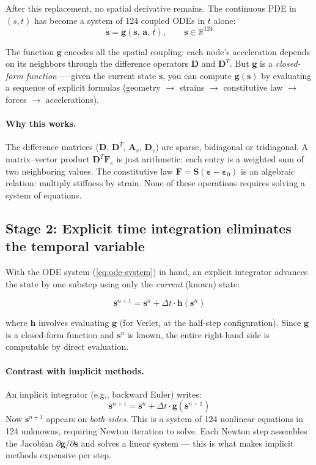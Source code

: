 \documentclass[11pt]{article}
\newcommand{\vect}[1]{\mathbf{#1}}
\newcommand{\mat}[1]{\mathbf{#1}}
\newcommand{\Real}{\mathbb{R}}
\begin{document}
\noindent
After this replacement, no spatial derivative remains.
The continuous PDE in $(s, t)$ has become a system of 124 coupled ODEs in $t$ alone:
\begin{equation}
  \dot{\vect{s}} = \vect{g}(\vect{s},\, \vect{a},\, t),
  \qquad \vect{s} \in \Real^{124}
  \label{eq:ode-system}
\end{equation}

The function $\vect{g}$ encodes all the spatial coupling: each node's acceleration depends on its neighbors through the difference operators $\mat{D}$ and $\mat{D}^T$.
But $\vect{g}$ is a \emph{closed-form function} --- given the current state $\vect{s}$, you can compute $\vect{g}(\vect{s})$ by evaluating a sequence of explicit formulas (geometry $\to$ strains $\to$ constitutive law $\to$ forces $\to$ accelerations).

\paragraph{Why this works.}
The difference matrices ($\mat{D}$, $\mat{D}^T$, $\mat{A}_v$, $\mat{D}_v$) are sparse, bidiagonal or tridiagonal.
A matrix--vector product $\mat{D}^T \vect{F}_e$ is just arithmetic: each entry is a weighted sum of two neighboring values.
The constitutive law $\vect{F} = \mat{S}(\bm{\varepsilon} - \bm{\varepsilon}_0)$ is an algebraic relation: multiply stiffness by strain.
None of these operations requires solving a system of equations.

\subsection{Stage 2: Explicit time integration eliminates the temporal variable}

With the ODE system (\ref{eq:ode-system}) in hand, an explicit integrator advances the state by one substep using only the \emph{current} (known) state:

\begin{equation}
  \vect{s}^{n+1} = \vect{s}^n + \Delta t \cdot \vect{h}(\vect{s}^n)
  \label{eq:explicit-step}
\end{equation}

where $\vect{h}$ involves evaluating $\vect{g}$ (for Verlet, at the half-step configuration).
Since $\vect{g}$ is a closed-form function and $\vect{s}^n$ is known, the entire right-hand side is computable by direct evaluation.

\paragraph{Contrast with implicit methods.}
An implicit integrator (e.g., backward Euler) writes:
\begin{equation}
  \vect{s}^{n+1} = \vect{s}^n + \Delta t \cdot \vect{g}(\vect{s}^{n+1})
  \label{eq:implicit-step}
\end{equation}
Now $\vect{s}^{n+1}$ appears on \emph{both sides}.
This is a system of 124 nonlinear equations in 124 unknowns, requiring Newton iteration to solve.
Each Newton step assembles the Jacobian $\partial\vect{g}/\partial\vect{s}$ and solves a linear system --- this is what makes implicit methods expensive per step.
\end{document}
